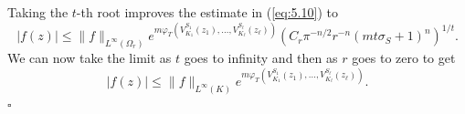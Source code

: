 \documentclass[a4paper,12pt,leqno,english]{article}
\numberwithin{equation}{section}
\newenvironment{proof}{\medbreak\noindent{\bf  Proof:}\rm}{\hfill$\square$\rm}
\begin{document}
\begin{proof}
\begin{equation*}
\end{equation*}
Taking the $t$-th root improves the estimate in (\ref{eq:5.10}) to
\begin{equation*}
    |f(z)|
    \leq
    \|f\|_{L^\infty(\Omega_r)}
            e^{m \varphi_T(V^{S_1}_{K_1}(z_1), \dots, V^{S_\ell}_{K_\ell}(z_\ell))}
        \left (
            C_r
            \pi^{-n/2} r^{-n}
            (mt \sigma_S + 1)^n
        \right )^{1/t}.
\end{equation*}
We can now take the limit as $t$ goes to infinity and then as $r$ goes to zero to get
\begin{equation*}
    |f(z)|
    \leq
        \|f\|_{L^\infty(K)} e^{m \varphi_T(V^{S_1}_{K_1}(z_1), \dots, V^{S_\ell}_{K_\ell}(z_\ell))}.
\end{equation*}
\end{proof}
\end{document}
